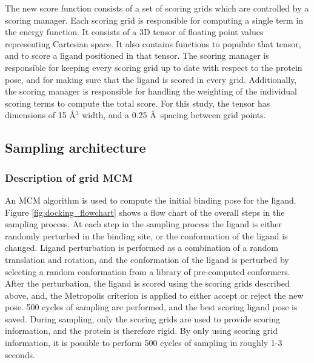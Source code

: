 The new score function consists of a set of scoring grids which are controlled by a scoring manager.
Each scoring grid is responsible for computing a single term in the energy function.
It consists of a 3D tensor of floating point values representing Cartesian space.
It also contains functions to populate that tensor, and to score a ligand positioned in that tensor.
The scoring manager is responsible for keeping every scoring grid up to date with respect to the protein pose, and for making sure that the ligand is scored in every grid.
Additionally, the scoring manager is responsible for handling the weighting of the individual scoring terms to compute the total score.
For this study, the tensor has dimensions of 15 \AA$^{3}$ width, and a 0.25 \AA\ spacing between grid points. 

\subsection{Sampling architecture}
\subsubsection{Description of grid MCM}
An MCM algorithm is used to compute the initial binding pose for the ligand.
Figure \ref{fig:docking_flowchart} shows a flow chart of the overall steps in the sampling process.
At each step in the sampling process the ligand is either randomly perturbed in the binding site, or the conformation of the ligand is changed.
Ligand perturbation is performed as a combination of a random translation and rotation, and the conformation of the ligand is perturbed by selecting a random conformation from a library of pre-computed conformers.
After the perturbation, the ligand is scored using the scoring grids described above, and, the Metropolis criterion is applied to either accept or reject the new pose.
500 cycles of sampling are performed, and the best scoring ligand pose is saved.
During sampling, only the scoring grids are used to provide scoring information, and the protein is therefore rigid.
By only using scoring grid information, it is possible to perform 500 cycles of sampling in roughly 1-3 seconds.

